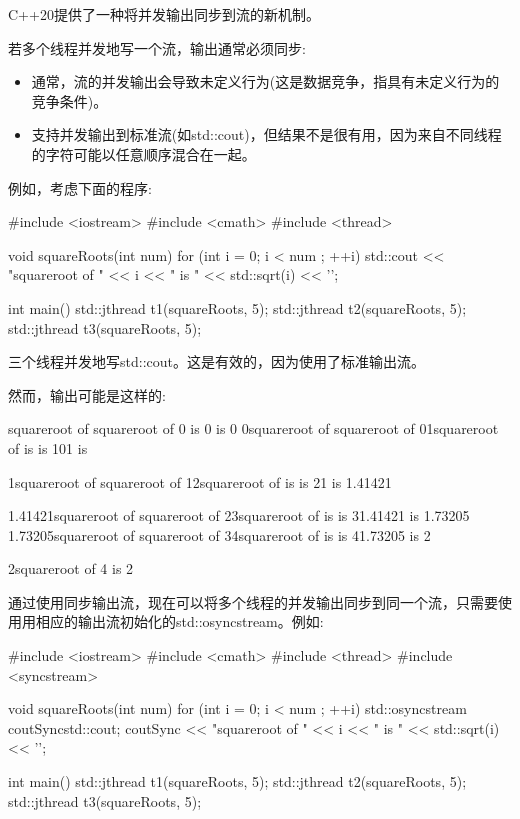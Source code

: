 

C++20提供了一种将并发输出同步到流的新机制。


若多个线程并发地写一个流，输出通常必须同步:

\begin{itemize}
\item
通常，流的并发输出会导致未定义行为(这是数据竞争，指具有未定义行为的竞争条件)。

\item
支持并发输出到标准流(如std::cout)，但结果不是很有用，因为来自不同线程的字符可能以任意顺序混合在一起。
\end{itemize}

例如，考虑下面的程序:


\begin{cpp}
#include <iostream>
#include <cmath>
#include <thread>

void squareRoots(int num)
{
	for (int i = 0; i < num ; ++i) {
		std::cout << "squareroot of " << i << " is "
		<< std::sqrt(i) << '\n';
	}
}

int main()
{
	std::jthread t1(squareRoots, 5);
	std::jthread t2(squareRoots, 5);
	std::jthread t3(squareRoots, 5);
}
\end{cpp}

三个线程并发地写std::cout。这是有效的，因为使用了标准输出流。

然而，输出可能是这样的:

\begin{shell}
squareroot of squareroot of 0 is 0 is 0
0squareroot of squareroot of
01squareroot of is is 101 is

1squareroot of squareroot of
12squareroot of is is 21 is 1.41421

1.41421squareroot of squareroot of
23squareroot of is is 31.41421 is 1.73205
1.73205squareroot of squareroot of
34squareroot of is is 41.73205 is 2

2squareroot of
4 is 2
\end{shell}


通过使用同步输出流，现在可以将多个线程的并发输出同步到同一个流，只需要使用用相应的输出流初始化的std::osyncstream。例如:


\begin{cpp}
#include <iostream>
#include <cmath>
#include <thread>
#include <syncstream>

void squareRoots(int num)
{
	for (int i = 0; i < num ; ++i) {
		std::osyncstream coutSync{std::cout};
		coutSync << "squareroot of " << i << " is "
		<< std::sqrt(i) << '\n';
	}
}

int main()
{
	std::jthread t1(squareRoots, 5);
	std::jthread t2(squareRoots, 5);
	std::jthread t3(squareRoots, 5);
}
\end{cpp}

